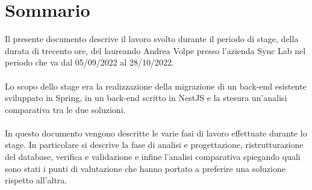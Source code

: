 
\cleardoublepage
{}
{}
\begingroup
\let\clearpage\relax
\let\cleardoublepage\relax
\let\cleardoublepage\relax

\chapter*{Sommario}

Il presente documento descrive il lavoro svolto durante il periodo di stage, della durata di trecento ore, del
laureando Andrea Volpe presso l'azienda Sync Lab nel periodo che va dal 05/09/2022 al 28/10/2022.
\\\\
Lo scopo dello stage era la realizzazione della migrazione di un \gls{back-end} esistente sviluppato in Spring, in un \gls{back-end}
scritto in NestJS e la stesura un'analisi comparativa tra le due soluzioni.
\\\\
In questo documento vengono descritte le varie fasi di lavoro effettuate durante lo stage. In particolare si descrive la fase
di analisi e progettazione, ristrutturazione del database, verifica e validazione e infine l'analisi comparativa spiegando
quali sono stati i punti di valutazione che hanno portato a preferire una soluzione rispetto all'altra.

%
%

\endgroup			

\vfill

